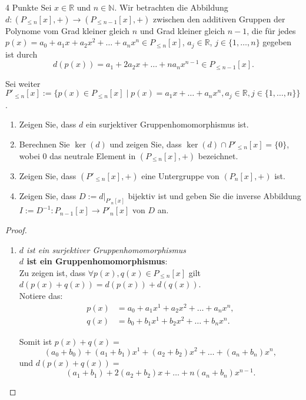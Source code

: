 \documentclass{../problemset}
\begin{document}
\begin{problem}{4 Punkte}
Sei $x \in \mathbb{R}$ und $n \in \mathbb{N}$.
Wir betrachten die Abbildung $d: (P_{\le n }[x], +) \to (P_{\le n-1}[x], +)$ zwischen den additiven Gruppen der Polynome vom Grad kleiner gleich $n$ und Grad kleiner gleich $n - 1$, die für jedes $p(x) = a_0 + a_1x + a_2x^2 + \ldots + a_nx^n \in P_{\le n}[x]$, $a_j \in \mathbb{R}$, $j \in \{1, \ldots, n\}$ gegeben ist durch \[
	d(p(x)) = a_1 + 2a_2x + \ldots + na_nx^{n-1} \in P_{\le n-1}[x].
\]

Sei weiter $P'_{\le n}[x] := \{p(x) \in P_{\le n}[x] \mid p(x) = a_1x + \ldots + a_nx^n, a_j \in \mathbb{R}, j \in \{1, \ldots, n\}\}$.

\begin{enumerate}
	\item Zeigen Sie, dass $d$ ein surjektiver Gruppenhomomorphismus ist.
	\item Berechnen Sie $\ker(d)$ und zeigen Sie, dass $\ker(d) \cap P'_{\le n}[x] = \{0\}$, wobei $0$ das neutrale Element in $(P_{\le n}[x], +)$ bezeichnet.
	\item Zeigen Sie, dass $(P'_{\le n}[x], +)$ eine Untergruppe von $(P_n[x], +)$ ist.
	\item Zeigen Sie, dass $D := d|_{P'_n[x]}$ bijektiv ist und geben Sie die inverse Abbildung $I := D^{-1}: P_{n-1}[x] \to P'_n[x]$ von $D$ an.
\end{enumerate}

\begin{proof}
	\begin{enumerate}
		\item \textit{$d$ ist ein surjektiver Gruppenhomomorphismus} \\
		      \textbf{$d$ ist ein Gruppenhomomorphismus}: \\
		      Zu zeigen ist, dass $\forall p(x),q(x) \in P_{\le n}[x]$ gilt $d(p(x) + q(x)) = d(p(x)) + d(q(x))$. \\

		      Notiere das:
		      \begin{align}
			      p(x) & = a_0 + a_1x^1 + a_2x^2 + \ldots + a_nx^n, \\
			      q(x) & = b_0 + b_1x^1 + b_2x^2 + \ldots + b_nx^n.
		      \end{align}

		      Somit ist $p(x) + q(x) =$ \[
			      (a_0+b_0) + (a_1+b_1)x^1 + (a_2 + b_2)x^2 + \ldots + (a_n+b_n)x^n,
		      \] und $d(p(x) + q(x)) =$ \[
			      (a_1+b_1) + 2(a_2 + b_2)x + \ldots + n(a_n+b_n)x^{n-1}.
		      \]


\end{enumerate}
\end{proof}
\end{problem}
\end{document}
